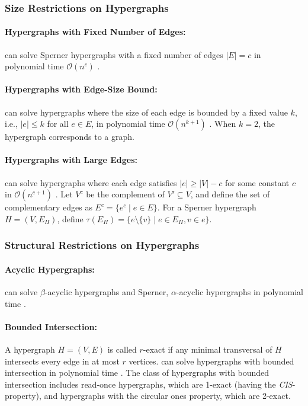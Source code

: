 \subsubsection*{Size Restrictions on Hypergraphs}

\paragraph{Hypergraphs with Fixed Number of Edges:} \TransHyp{} can solve Sperner hypergraphs with a fixed number of edges $|E|=c$ in polynomial time $\mathcal{O}(n^c)$ \cite{EG02}.

\paragraph{Hypergraphs with Edge-Size Bound:} \TransHyp{} can solve hypergraphs where the size of each edge is bounded by a fixed value $k$, i.e., $|e|\leq k$ for all $e\in E$, in polynomial time $\mathcal{O}(n^{k+1})$ \cite{BGH98}. When $k=2$, the hypergraph corresponds to a graph.

\paragraph{Hypergraphs with Large Edges:} \TransHyp{} can solve hypergraphs where each edge satisfies $|e|\geq|V|-c$ for some constant $c$ in $\mathcal{O}(n^{c+1})$ \cite{BGH98}. Let $V^c$ be the complement of $V'\subseteq V$, and define the set of complementary edges as $E^c=\{e^c\mid e\in E\}$. For a Sperner hypergraph $H=(V,E_H)$, define $\tau(E_H)=\{e\setminus\{v\}\mid e\in E_H,v\in e\}$.  

\subsubsection*{Structural Restrictions on Hypergraphs}

\paragraph{Acyclic Hypergraphs:} \TransHyp{} can solve $\beta$-acyclic hypergraphs and Sperner, $\alpha$-acyclic hypergraphs in polynomial time \cite{EGM03}.

\paragraph{Bounded Intersection:} A hypergraph $H=(V,E)$ is called $r$-exact if any minimal transversal of $H$ intersects every edge in at most $r$ vertices. \TransHyp{} can solve hypergraphs with bounded intersection in polynomial time \cite{ER10}. The class of hypergraphs with bounded intersection includes read-once hypergraphs, which are 1-exact (having the \emph{CIS}-property), and hypergraphs with the circular ones property, which are 2-exact.

